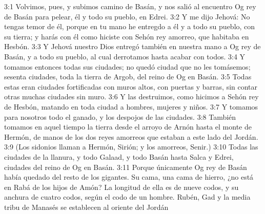 3:1 Volvimos, pues, y subimos camino de Basán, y nos salió al encuentro Og rey de Basán para pelear, él y todo su pueblo, en Edrei.  
3:2 Y me dijo Jehová: No tengas temor de él, porque en tu mano he entregdo a él y a todo su pueblo, con su tierra; y harás con él como hiciste con Sehón rey amorreo, que habitaba en Hesbón.  
3:3 Y Jehová nuestro Dios entregó también en nuestra mano a Og rey de Basán, y a todo su pueblo, al cual derrotamos hasta acabar con todos.  
3:4 Y tomamos entonces todas sus ciudades; no quedó ciudad que no les tomásemos; sesenta ciudades, toda la tierra de Argob, del reino de Og en Basán.  
3:5 Todas estas eran ciudades fortificadas con muros altos, con puertas y barras, sin contar otras muchas ciudades sin muro.  
3:6 Y las destruimos, como hicimos a Sehón rey de Hesbón, matando en toda ciudad a hombres, mujeres y niños.  
3:7 Y tomamos para nosotros todo el ganado, y los despojos de las ciudades.  
3:8 También tomamos en aquel tiempo la tierra desde el arroyo de Arnón hasta el monte de Hermón, de manos de los dos reyes amorreos que estaban a este lado del Jordán.  
3:9 (Los sidonios llaman a Hermón, Sirión; y los amorreos, Senir.)  
3:10 Todas las ciudades de la llanura, y todo Galaad, y todo Basán hasta Salca y Edrei, ciudades del reino de Og en Basán.  
3:11 Porque únicamente Og rey de Basán había quedado del resto de los gigantes. Su cama, una cama de hierro, ¿no está en Rabá de los hijos de Amón? La longitud de ella es de nueve codos,  y su anchura de cuatro codos, según el codo de un hombre.  
Rubén, Gad y la media tribu de Manasés se establecen al oriente del Jordán  
 
